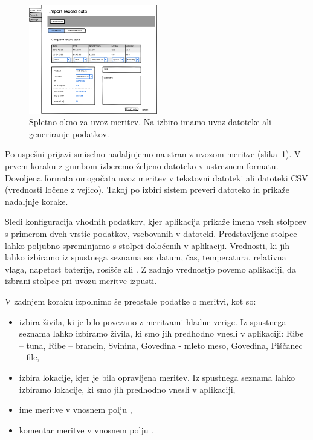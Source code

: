 \documentclass[a4paper, 12pt]{book}
\begin{document}
\begin{figure}[h]
\begin{center}
\includegraphics[width=0.5\textwidth]{slike/Import-data.png}
\end{center}
\caption{Spletno okno za uvoz meritev. Na izbiro imamo uvoz datoteke ali generiranje podatkov.}
\label{import-data-wireframe}
\end{figure}

Po uspešni prijavi smiselno nadaljujemo na stran z uvozom meritve (slika~\ref{import-data-wireframe}). V prvem koraku z gumbom  izberemo željeno datoteko v ustreznem formatu. Dovoljena formata omogočata uvoz meritev v tekstovni datoteki ali datoteki CSV (vrednosti ločene z vejico). Takoj po izbiri sistem preveri datoteko in prikaže nadaljnje korake.

Sledi konfiguracija vhodnih podatkov, kjer aplikacija prikaže imena vseh stolpcev s primerom dveh vrstic podatkov, vsebovanih v datoteki. Predstavljene stolpce lahko poljubno spreminjamo s stolpci določenih v aplikaciji. Vrednosti, ki jih lahko izbiramo iz spustnega seznama so: datum, čas, temperatura, relativna vlaga, napetost baterije, rosišče ali . Z zadnjo vrednostjo povemo aplikaciji, da izbrani stolpec pri uvozu meritve izpusti.

\noindent V zadnjem koraku izpolnimo še preostale podatke o meritvi, kot so: 
\begin{itemize}
	\item izbira živila, ki je bilo povezano z meritvami hladne verige. Iz spustnega seznama  lahko izbiramo živila, ki smo jih predhodno vnesli v aplikaciji: Ribe – tuna, Ribe – brancin, Svinina, Govedina - mleto meso, Govedina, Piščanec – file,
	
	\item izbira lokacije, kjer je bila opravljena meritev. Iz spustnega seznama  lahko izbiramo lokacije, ki smo jih predhodno vnesli v aplikaciji,
	
	\item ime meritve v vnosnem polju ,
	
	\item komentar meritve v vnosnem polju .
\end{itemize}
\end{document}
